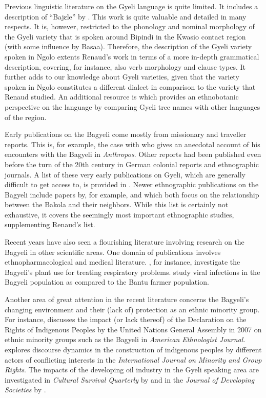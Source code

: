 Previous linguistic literature on the Gyeli language is quite limited. It includes a description of ``Bajɛle'' by \citet{renaud76}. This work is quite valuable and detailed in many respects. It is, however, restricted to the phonology and nominal morphology of the Gyeli variety that is spoken around Bipindi in the Kwasio contact region (with some influence by Basaa).
Therefore, the description of the Gyeli variety spoken in Ngolo extents Renaud's work in terms of a more in-depth grammatical description, covering, for instance, also verb morphology and clause types. It further adds to our knowledge about Gyeli varieties, given that the variety spoken in Ngolo constitutes a different dialect in comparison to the variety that Renaud studied. 
An additional resource is   \citet{letouzey75} which provides an ethnobotanic perspective on the language by comparing Gyeli tree names with other languages of the region.

Early publications on the Bagyeli  come mostly from missionary and traveller reports. This is, for example, the case with \citet{seiwert26} who gives an anecdotal account of his encounters with the Bagyeli in {\itshape Anthropos}. Other reports had been published even before the turn of the 20th century in German colonial reports and ethnographic journals. A list of these very early publications on Gyeli, which are generally difficult to get access to, is provided in \citet[357-360]{renaud76}. 
Newer ethnographic publications on the Bagyeli include papers by, for example, \citet{joiris94} and \citet{ngima2001} which both focus on the relationship between the Bakola and their neighbors. 
While this list is certainly not exhaustive, it covers the seemingly most important ethnographic studies, supplementing Renaud's list.

Recent years have also seen a flourishing literature involving research on the Bagyeli in other scientific areas. One domain of publications involves ethnopharmacological and medical literature. \citet{fomogne2014},  for instance, investigate the Bagyeli's plant use for treating respiratory problems.  \citet{mauclere2011} study viral infections in the Bagyeli population as compared to the Bantu farmer population.

Another area of great attention in the recent literature concerns  the Bagyeli's changing environment and their (lack of) protection as an ethnic minority group. For instance, \citet{pelican2009} discusses the impact (or lack thereof) of the Declaration on the Rights of Indigenous Peoples by the United Nations General Assembly in 2007 on ethnic minority groups such as the Bagyeli in {\itshape American Ethnologist Journal}. \citet{germond2012} explores discourse dynamics in the construction of indigenous peoples by different actors of conflicting interests in the {\itshape International Journal on Minority and Group Rights}. The impacts of the developing oil industry in the Gyeli speaking area are investigated in {\itshape Cultural Survival Quarterly} by \citet{nelson2004} and in the {\itshape Journal of Developing Societies} by \citet{swing2012}. 


